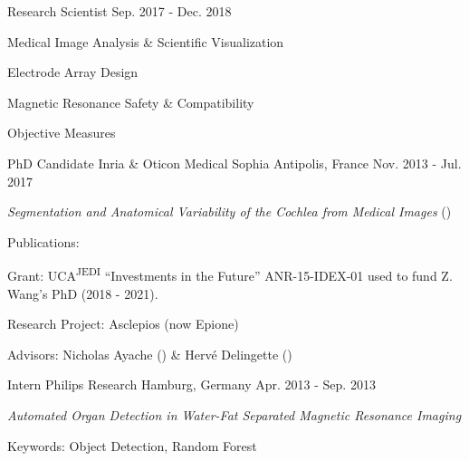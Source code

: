 \begin{cventries}
  \cventry
    {Research Scientist} %
    {} %
    {} %
    {Sep. 2017 - Dec. 2018} %
    {
      \begin{cvitems} %
        \item {Medical Image Analysis \& Scientific Visualization \hyperlink{DVG+19}{\honordatestyle{[DVG+19,}}\hyperlink{DVG+18b}{\honordatestyle{~DVG+18b]}}}
        \item {Electrode Array Design \hyperlink{MDH+19}{\honordatestyle{[MDH+19,}}\hyperlink{DVG+18a}{\honordatestyle{~DVG+18a]}}}
        \item {Magnetic Resonance Safety \& Compatibility \hyperlink{MH18}{\honordatestyle{[MH18]}}}
        \item {Objective Measures \hyperlink{RHD+18}{\honordatestyle{[RHD+18]}}}
      \end{cvitems}
    }

  \cventry
    {PhD Candidate} %
    {Inria \& Oticon Medical} %
    {Sophia Antipolis, France} %
    {Nov. 2013 - Jul. 2017} %
    {
      \begin{cvitems} %
        \item {\textit{Segmentation and Anatomical Variability of the Cochlea from Medical Images} ()}
        \item {Publications: \hyperlink{VDR+15}{\honordatestyle{[VDR+15,}}\hyperlink{GDV+16}{}\hyperlink{DVR+16}{}\hyperlink{DVG+17}{}\hyperlink{DWV+20}{\honordatestyle{~DWV+20]}}}
        \item {Grant: UCA\textsuperscript{JEDI} “Investments in the Future” ANR-15-IDEX-01 used to fund Z. Wang's PhD (2018 - 2021).}
        \item {Research Project: Asclepios (now Epione)}
        \item {Advisors: Nicholas Ayache () \& Hervé Delingette ()}
      \end{cvitems}
    }

  \cventry
    {Intern} %
    {Philips Research} %
    {Hamburg, Germany} %
    {Apr. 2013 - Sep. 2013} %
    {
      \begin{cvitems} %
        \item {\textit{Automated Organ Detection in Water-Fat Separated Magnetic Resonance Imaging} \hyperlink{DSS14}{\honordatestyle{[DSS14]}}}
        \item {Keywords: Object Detection, Random Forest}
      \end{cvitems}
    }


\end{cventries}
